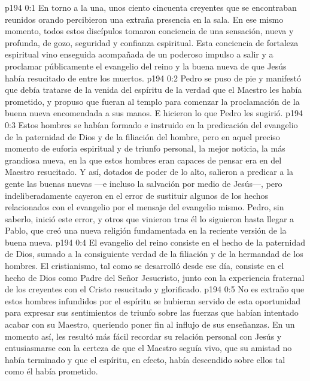 \author{Comisión de seres intermedios}
\vs p194 0:1 En torno a la una, unos ciento cincuenta creyentes que se encontraban reunidos orando percibieron una extraña presencia en la sala. En ese mismo momento, todos estos discípulos tomaron conciencia de una sensación, nueva y profunda, de gozo, seguridad y confianza espiritual. Esta conciencia de fortaleza espiritual vino enseguida acompañada de un poderoso impulso a salir y a proclamar públicamente el evangelio del reino y la buena nueva de que Jesús había resucitado de entre los muertos.
\vs p194 0:2 Pedro se puso de pie y manifestó que debía tratarse de la venida del espíritu de la verdad que el Maestro les había prometido, y propuso que fueran al templo para comenzar la proclamación de la buena nueva encomendada a sus manos. E hicieron lo que Pedro les sugirió.
\vs p194 0:3 \pc Estos hombres se habían formado e instruido en la predicación del evangelio de la paternidad de Dios y de la filiación del hombre, pero en aquel preciso momento de euforia espiritual y de triunfo personal, la mejor noticia, la más grandiosa nueva, en la que estos hombres eran capaces de pensar era en  del Maestro resucitado. Y así, dotados de poder de lo alto, salieron a predicar a la gente las buenas nuevas ---e incluso la salvación por medio de Jesús---, pero indeliberadamente cayeron en el error de sustituir algunos de los hechos relacionados con el evangelio por el mensaje del evangelio mismo. Pedro, sin saberlo, inició este error, y otros que vinieron tras él lo siguieron hasta llegar a Pablo, que creó una nueva religión fundamentada en la reciente versión de la buena nueva.
\vs p194 0:4 El evangelio del reino consiste en el hecho de la paternidad de Dios, sumado a la consiguiente verdad de la filiación y de la hermandad de los hombres. El cristianismo, tal como se desarrolló desde ese día, consiste en el hecho de Dios como Padre del Señor Jesucristo, junto con la experiencia fraternal de los creyentes con el Cristo resucitado y glorificado.
\vs p194 0:5 No es extraño que estos hombres infundidos por el espíritu se hubieran servido de esta oportunidad para expresar sus sentimientos de triunfo sobre las fuerzas que habían intentado acabar con su Maestro, queriendo poner fin al influjo de sus enseñanzas. En un momento así, les resultó más fácil recordar su relación personal con Jesús y entusiasmarse con la certeza de que el Maestro seguía vivo, que su amistad no había terminado y que el espíritu, en efecto, había descendido sobre ellos tal como él había prometido.
